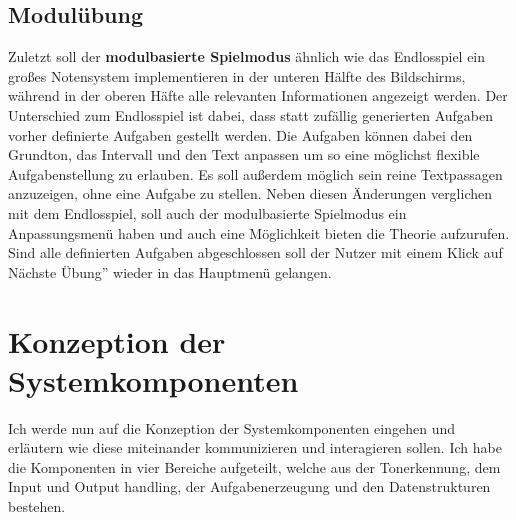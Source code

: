 \subsection{Modulübung}
Zuletzt soll der \textbf{modulbasierte Spielmodus} ähnlich wie das Endlosspiel ein großes Notensystem implementieren in der unteren Hälfte des Bildschirms, während in der oberen Häfte alle relevanten Informationen angezeigt werden. Der Unterschied zum Endlosspiel ist dabei, dass statt zufällig generierten Aufgaben vorher definierte Aufgaben gestellt werden. Die Aufgaben können dabei den Grundton, das Intervall und den Text anpassen um so eine möglichst flexible Aufgabenstellung zu erlauben. Es soll außerdem möglich sein reine Textpassagen anzuzeigen, ohne eine Aufgabe zu stellen. Neben diesen Änderungen verglichen mit dem Endlosspiel, soll auch der modulbasierte Spielmodus ein Anpassungsmenü haben und auch eine Möglichkeit bieten die Theorie aufzurufen. Sind alle definierten Aufgaben abgeschlossen soll der Nutzer mit einem Klick auf \glqq Nächste Übung'' wieder in das Hauptmenü gelangen. 

\section{Konzeption der Systemkomponenten}


%

Ich werde nun auf die Konzeption der Systemkomponenten eingehen und erläutern wie diese miteinander kommunizieren und interagieren sollen. Ich habe die Komponenten in vier Bereiche aufgeteilt, welche aus der Tonerkennung, dem Input und Output handling, der Aufgabenerzeugung und den Datenstrukturen bestehen.\\

